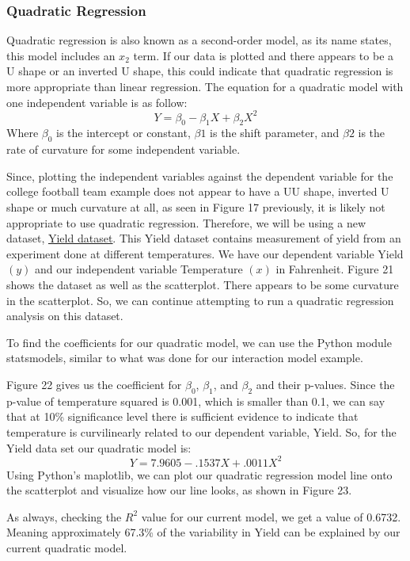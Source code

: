 \documentclass[a4paper,12pt]{report}
\newcommand{\link}[2]{\hyperlink{#1}{\underline{#2}}}
\begin{document}
\subsubsection{Quadratic Regression}
Quadratic regression is also known as a second-order model, as its name states, this model includes an $x_2$ term. If our data is plotted and there appears to be a U shape or an inverted U shape, this could indicate that quadratic regression is more appropriate than linear regression. The equation for a quadratic model with one independent variable is as follow:
$$Y=\beta_0-\beta_1X+\beta_2X^2$$
Where $\beta_0$ is the intercept or constant, $\beta1$ is the shift parameter, and $\beta2$ is the rate of curvature for some independent variable.

Since, plotting the independent variables against the dependent variable for the college football team example does not appear to have a UU shape, inverted U shape or much curvature at all, as seen in Figure 17 previously, it is likely not appropriate to use quadratic regression. Therefore, we will be using a new dataset, \link{https://online.stat.psu.edu/stat462/node/159/}{Yield dataset}. This Yield dataset contains measurement of yield from an experiment done at different temperatures. We have our dependent variable Yield $(y)$ and our independent variable Temperature $(x)$ in Fahrenheit. Figure 21 shows the dataset as well as the scatterplot. There appears to be some curvature in the scatterplot. So, we can continue attempting to run a quadratic regression analysis on this dataset.

To find the coefficients for our quadratic model, we can use the Python module statsmodels, similar to what was done for our interaction model example. 

Figure 22 gives us the coefficient for $\beta_0$, $\beta_1$, and $\beta_2$ and their p-values. Since the p-value of temperature squared is 0.001, which is smaller than 0.1, we can say that at 10\% significance level there is sufficient evidence to indicate that temperature is curvilinearly related to our dependent variable, Yield. So, for the Yield data set our quadratic model is:
$$Y=7.9605-.1537X+.0011X^2$$
Using Python’s maplotlib, we can plot our quadratic regression model line onto the scatterplot and visualize how our line looks, as shown in Figure 23. 

As always, checking the $R^2$ value for our current model, we get a value of 0.6732. Meaning approximately 67.3\% of the variability in Yield can be explained by our current quadratic model. 
\end{document}
